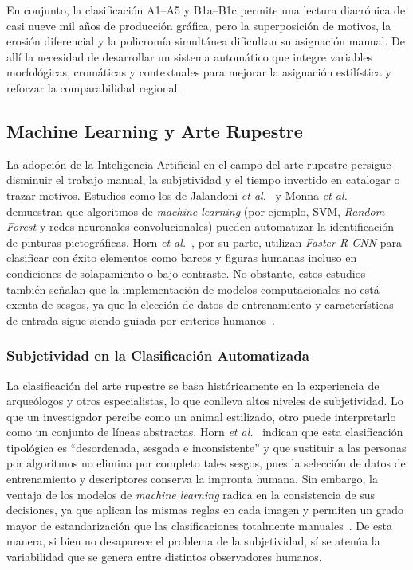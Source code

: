 En conjunto, la clasificación A1–A5 y B1a–B1c permite una lectura diacrónica de casi nueve mil años de producción gráfica, pero la superposición de motivos, la erosión diferencial y la policromía simultánea dificultan su asignación manual.
De allí la necesidad de desarrollar un sistema automático que integre variables morfológicas, cromáticas y contextuales para mejorar la asignación estilística y reforzar la comparabilidad regional.

\subsection{Machine Learning y Arte Rupestre}

La adopción de la Inteligencia Artificial en el campo del arte rupestre persigue disminuir el trabajo manual, la subjetividad y el tiempo invertido en catalogar o trazar motivos.
Estudios como los de Jalandoni \textit{et al.}~\cite{jalandoni2022} y Monna \textit{et al.}~\cite{monna2022} demuestran que algoritmos de \textit{machine learning} (por ejemplo, SVM, \textit{Random Forest} y redes neuronales convolucionales) pueden automatizar la identificación de pinturas pictográficas.
Horn \textit{et al.}~\cite{horn2022}, por su parte, utilizan \textit{Faster R-CNN} para clasificar con éxito elementos como barcos y figuras humanas incluso en condiciones de solapamiento o bajo contraste.
No obstante, estos estudios también señalan que la implementación de modelos computacionales no está exenta de sesgos, ya que la elección de datos de entrenamiento y características de entrada sigue siendo guiada por criterios humanos~\cite{horn2022}.

\subsubsection*{Subjetividad en la Clasificación Automatizada}

La clasificación del arte rupestre se basa históricamente en la experiencia de arqueólogos y otros especialistas, lo que conlleva altos niveles de subjetividad.
Lo que un investigador percibe como un animal estilizado, otro puede interpretarlo como un conjunto de líneas abstractas.
Horn \textit{et al.}~\cite{horn2022} indican que esta clasificación tipológica es “desordenada, sesgada e inconsistente” y que sustituir a las personas por algoritmos no elimina por completo tales sesgos, pues la selección de datos de entrenamiento y descriptores conserva la impronta humana.
Sin embargo, la ventaja de los modelos de \textit{machine learning} radica en la consistencia de sus decisiones, ya que aplican las mismas reglas en cada imagen y permiten un grado mayor de estandarización que las clasificaciones totalmente manuales~\cite{jalandoni2022}.
De esta manera, si bien no desaparece el problema de la subjetividad, sí se atenúa la variabilidad que se genera entre distintos observadores humanos.

